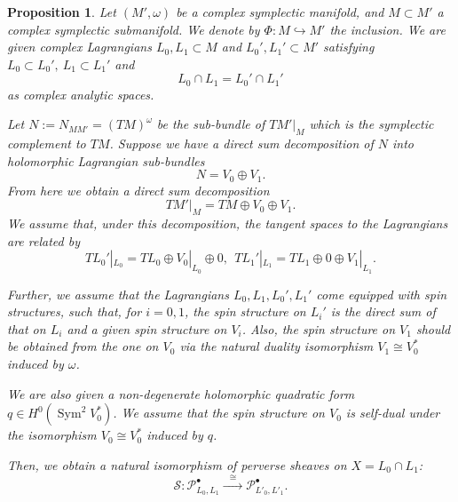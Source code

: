 \documentclass [11pt]{amsart}
\newtheorem {proposition}[theorem]{Proposition}
\theoremstyle{remark}
\def\Sym{{\operatorname{Sym}}}
\def\Stab{\mathscr{S}}
\def\Pb {\mathcal{P}^\bullet}
\begin{document}
\begin{proposition}
\label{prop:stabL}
Let $(M', \omega)$ be a complex symplectic manifold, and $M \subset M'$ a complex symplectic  submanifold. We denote by $\Phi: M \hookrightarrow M'$ the inclusion. We are given complex Lagrangians $L_0, L_1 \subset M$ and $L_0', L_1' \subset M'$ satisfying $ L_0 \subset L_0', \ L_1 \subset L_1'$
and 
$$L_0 \cap L_1 = L_0' \cap L_1'$$
as complex analytic spaces.

Let $N:=N_{MM'} = (TM)^{\omega}$ be the sub-bundle of $TM'|_M$ which is the symplectic complement to $TM$. Suppose we have a direct sum decomposition of $N$ into holomorphic Lagrangian sub-bundles
$$ N = V_0 \oplus V_1.$$
From here we obtain a direct sum decomposition
$$ TM'|_M = TM \oplus V_0 \oplus V_1.$$
We assume that, under this decomposition, the tangent spaces to the Lagrangians are related by
$$ TL_0'|_{L_0} = TL_0 \oplus V_0|_{L_0} \oplus 0, \  \ TL_1'|_{L_1} = TL_1 \oplus 0 \oplus V_1|_{L_1}.$$
 
Further, we assume that the Lagrangians $L_0, L_1, L_0', L_1'$ come equipped with spin structures, such that, for $i=0,1$, the spin structure on $L_i'$ is the direct sum of that on $L_i$ and a given spin structure on $V_i$. Also, the spin structure on $V_1$ should be obtained from the one on $V_0$ via the natural duality isomorphism $V_1 \cong V_0^*$ induced by $\omega$.

We are also given a non-degenerate holomorphic quadratic form $q \in H^0(\Sym^2 V_0^*)$. We assume that the spin structure on $V_0$ is self-dual under the isomorphism $V_0 \cong V_0^*$ induced by $q$.

Then, we obtain a natural isomorphism of perverse sheaves on $X=L_0 \cap L_1$:
$$\Stab: \Pb_{L_0, L_1} \xrightarrow{\phantom{b}\cong\phantom{b}} \Pb_{L'_0, L'_1}.$$
\end{proposition}
\end{document}
